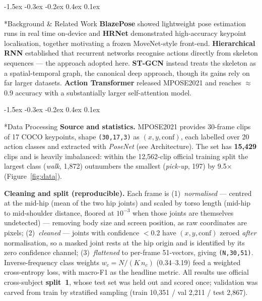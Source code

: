 \documentclass[final]{article}
\makeatletter
\renewcommand{\section}{%
  \@startsection{section}{1}{\z@}%
                {-1.5ex \@plus -0.3ex \@minus -0.2ex}%
                {0.4ex \@plus 0.1ex}%
                {\large\bf\raggedright}%
}
\makeatother
\begin{document}
\section*{Background \& Related Work}
\textbf{BlazePose} \citep{bazarevsky2020blazepose} showed lightweight pose estimation runs in real time on-device and \textbf{HRNet} \citep{sun2019hrnet} demonstrated high-accuracy keypoint localisation, together motivating a frozen MoveNet-style front-end. \textbf{Hierarchical RNN} \citep{du2015hierarchical} established that recurrent networks recognise actions directly from skeleton sequences --- the approach adopted here. \textbf{ST-GCN} \citep{yan2018stgcn} instead treats the skeleton as a spatial-temporal graph, the canonical deep approach, though its gains rely on far larger datasets. \textbf{Action Transformer} \citep{mazzia2021action} released MPOSE2021 and reaches $\approx$0.9 accuracy with a substantially larger self-attention model.

\section*{Data Processing}
\textbf{Source and statistics.} MPOSE2021 \citep{mazzia2021action,mpose2021zenodo,pic4ser2021mpose} provides 30-frame clips of 17 COCO keypoints, shape \texttt{(30,17,3)} as $(x,y,\mathrm{conf})$, each labelled over 20 action classes and extracted with \emph{PoseNet} (see Architecture). The set has \textbf{15{,}429} clips and is heavily imbalanced: within the 12{,}562-clip official training split the largest class (\emph{walk}, 1{,}872) outnumbers the smallest (\emph{pick-up}, 197) by 9.5$\times$ (Figure~\ref{fig:data}).

\textbf{Cleaning and split (reproducible).} Each frame is (1)~\emph{normalised} --- centred at the mid-hip (mean of the two hip joints) and scaled by torso length (mid-hip to mid-shoulder distance, floored at $10^{-3}$ when those joints are themselves undetected) --- removing body size and screen position, as raw coordinates are pixels; (2)~\emph{cleaned} --- joints with confidence $<0.2$ have $(x,y,\mathrm{conf})$ zeroed \emph{after} normalisation, so a masked joint rests at the hip origin and is identified by its zero confidence channel; (3)~\emph{flattened} to per-frame 51-vectors, giving \texttt{(N,30,51)}. Inverse-frequency class weights $w_c = N/(K\,n_c)$ (0.34--3.19) feed a weighted cross-entropy loss, with macro-F1 as the headline metric. All results use official cross-subject \textbf{split~1}, whose test set was held out and scored once; validation was carved from train by stratified sampling (train 10{,}351 / val 2{,}211 / test 2{,}867).
\end{document}
